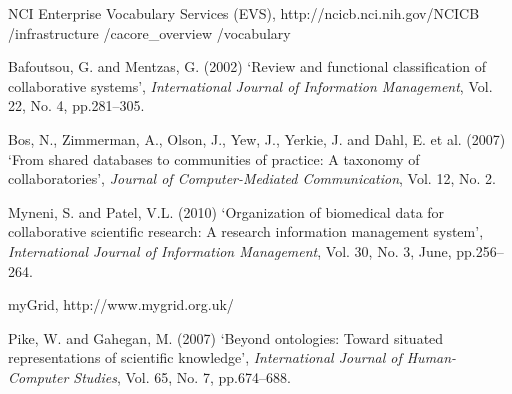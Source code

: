 \documentclass{singlecol-new}
\theoremstyle{TH}{
\newtheorem{lemma}{Lemma}
\newtheorem{theorem}[lemma]{Theorem}
\newtheorem{corrolary}[lemma]{Corrolary}
\newtheorem{conjecture}[lemma]{Conjecture}
\newtheorem{proposition}[lemma]{Proposition}
\newtheorem{claim}[lemma]{Claim}
\newtheorem{stheorem}[lemma]{Wrong Theorem}
\newtheorem{algorithm}{Algorithm}
}
\theoremstyle{THrm}{
\newtheorem{definition}{Definition}[section]
\newtheorem{question}{Question}[section]
\newtheorem{remark}{Remark}
\newtheorem{scheme}{Scheme}
}
\theoremstyle{THhit}{
\newtheorem{case}{Case}[section]
}
\begin{document}
\begin{thebibliography}{10}
 NCI Enterprise Vocabulary Services
(EVS), http://ncicb.nci.nih.gov/NCICB /infrastructure
/cacore\_overview /vocabulary

Bafoutsou, G. and Mentzas, G. (2002) `Review and functional
classification of collaborative systems', {\it International Journal
of Information Management}, Vol. 22, No. 4, pp.281--305.

Bos, N., Zimmerman, A., Olson, J., Yew, J., Yerkie, J. and Dahl, E.
et al. (2007) `From shared databases to communities of practice: A
taxonomy of collaboratories', {\it Journal of Computer-Mediated
Communication},  Vol. 12, No. 2.

Myneni, S. and  Patel, V.L. (2010) `Organization of biomedical data
for collaborative scientific research: A research information
management system', {\it International Journal of Information
Management}, Vol. 30, No. 3, June, pp.256--264.

myGrid, http://www.mygrid.org.uk/

Pike, W. and Gahegan, M. (2007) `Beyond ontologies: Toward situated
representations of scientific knowledge', {\it International Journal
of Human-Computer Studies}, Vol. 65, No. 7, pp.674--688.
\end{thebibliography}
\end{document}
